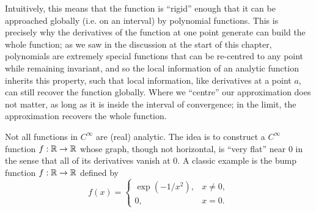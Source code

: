 \documentclass[../analysis1.tex]{subfiles}
\begin{document}
Intuitively, this means that the function is ``rigid'' enough that it can be approached globally (i.e. on an interval) by polynomial functions. This is precisely why the derivatives of the function at one point generate can build the whole function; as we saw in the discussion at the start of this chapter, polynomials are extremely special functions that can be re-centred to any point while remaining invariant, and so the local information of an analytic function inherits this property, such that local information, like derivatives at a point $a$, can still recover the function globally. Where we ``centre'' our approximation does not matter, as long as it is inside the interval of convergence; in the limit, the approximation recovers the whole function.

\begin{example}
    Not all functions in $C^{\infty}$ are (real) analytic. The idea is to construct a $C^{\infty}$ function $f:\mathbb{R}\to\mathbb{R}$ whose graph, though not horizontal, is ``very flat'' near $0$ in the sense that all of its derivatives vanish at $0$. A classic example is the bump function $f:\mathbb{R}\to\mathbb{R}$ defined by
    \[
        f(x) = \begin{cases} 
        \exp(-1/x^2), & x \neq 0, \\ 
        0, & x = 0. 
        \end{cases}
    \]
    \begin{center}
\end{center}
\end{example}
\end{document}
